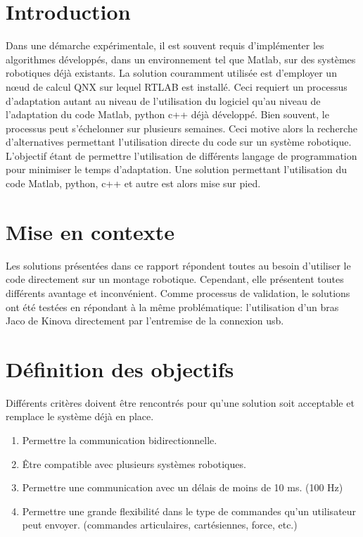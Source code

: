 \documentclass[root.tex]{subfiles}
\begin{document}
\section{Introduction}
Dans une démarche expérimentale, il est souvent requis d'implémenter les algorithmes développés, dans un environnement tel que Matlab, sur des systèmes robotiques déjà existants. 
La solution couramment utilisée est d'employer un nœud de calcul QNX sur lequel RTLAB est installé. 
Ceci requiert un processus d'adaptation autant au niveau de l'utilisation du logiciel qu'au niveau de l'adaptation du code Matlab, python c++ déjà développé. 
Bien souvent, le processus peut s'échelonner sur plusieurs semaines. 
Ceci motive alors la recherche d'alternatives permettant l'utilisation directe du code sur un système robotique. 
L'objectif étant de permettre l'utilisation de différents langage de programmation pour minimiser le temps d'adaptation. 
Une solution permettant l'utilisation du code Matlab, python, c++ et autre est alors mise sur pied.

\section{Mise en contexte}

Les solutions présentées dans ce rapport répondent toutes au besoin d'utiliser le code directement sur un montage robotique. 
Cependant, elle présentent toutes différents avantage et inconvénient. 
Comme processus de validation, le solutions ont été testées en répondant à la même problématique: l'utilisation d'un bras Jaco de Kinova directement par l'entremise de la connexion usb.


\section{Définition des objectifs}

Différents critères doivent être rencontrés pour qu'une solution soit acceptable et remplace le système déjà en place.

\begin{enumerate}
\item Permettre la communication bidirectionnelle.
\item Être compatible avec plusieurs systèmes robotiques.
\item Permettre une communication avec un délais de moins de 10 ms. (100 Hz)
\item Permettre une grande flexibilité dans le type de commandes qu'un utilisateur peut envoyer. (commandes articulaires, cartésiennes, force, etc.)
\end{enumerate}
\end{document}
